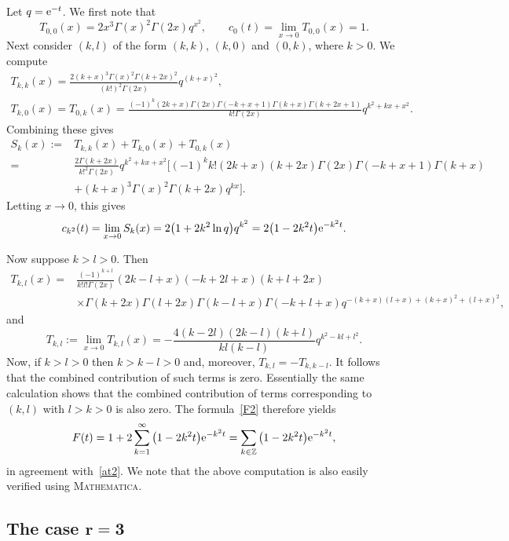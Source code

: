 \documentclass[pdftex]{sigma}
\theoremstyle{definition}
\newcommand\Z{{\mathbb Z}}
\begin{document}
Let $q={\rm e}^{-t}$. We first note that
\[T_{0,0}(x)=2x^3 \Gamma (x)^2 \Gamma (2 x) q^{x^2},\qquad
c_0(t)=\lim_{x\to 0} T_{0,0}(x)=1.\]
Next consider $(k,l)$ of the form $(k,k)$, $(k,0)$ and $(0,k)$, where $k>0$.
We compute
\begin{gather*}
T_{k,k}(x)=\frac{2 (k+x)^3 \Gamma (x)^2 \Gamma (k+2 x)^2}{(k!)^2\Gamma(2x)} q^{(k+x)^2},\\
T_{k,0}(x)=T_{0,k}(x)= \frac{(-1)^k (2 k+x) \Gamma (2 x) \Gamma (-k+x+1) \Gamma (k+x) \Gamma
 (k+2 x+1)}{k!\Gamma(2x)} q^{k^2+k x+x^2}.\end{gather*}
Combining these gives
\begin{align*}
S_k(x) :={}& T_{k,k}(x)+T_{k,0}(x)+T_{0,k}(x) \\
={}& \frac{2 \Gamma (k+2 x) }{k!^2\Gamma(2x)} q^{k^2+k x+x^2}
\big[ (-1)^k k! (2 k+x) (k+2 x) \Gamma (2 x)
 \Gamma (-k+x+1) \Gamma (k+x) \\
 & +(k+x)^3 \Gamma (x)^2 \Gamma (k+2x) q^{kx } \big].
\end{align*}
Letting $x\to 0$, this gives
\[c_{k^2}(t)=\lim_{x\to 0} S_k(x) = 2\big(1+2k^2\ln q\big)q^{k^2}=2\big(1-2k^2t\big){\rm e}^{-k^2 t}.\]

Now suppose $k>l>0$. Then
\begin{align*}
T_{k,l}(x)={}& \frac{ (-1)^{k+l}}{k! l! \Gamma(2x)} (2 k-l+x) (-k+2 l+x) (k+l+2 x) \\
&\times \Gamma (k+2 x) \Gamma (l+2 x) \Gamma (k-l+x) \Gamma (-k+l+x) q^{-(k+x)
 (l+x)+(k+x)^2+(l+x)^2},
\end{align*}
and
\[T_{k,l}:=\lim_{x\to 0} T_{k,l}(x)=-\frac{4 (k-2 l) (2 k-l) (k+l) }{k l (k-l)} q^{k^2-k l+l^2}.\]
Now, if $k>l>0$ then $k>k-l>0$ and, moreover,
$T_{k,l}=-T_{k,k-l}$.
It follows that the combined contribution of such terms is zero.
Essentially the same calculation shows that the
combined contribution of terms corresponding to $(k,l)$ with $l>k>0$ is also zero.
The formula~\eqref{F2} therefore yields
\[F(t)=1+2\sum_{k=1}^\infty \big(1-2k^2t\big){\rm e}^{-k^2 t} = \sum_{k\in\Z} \big(1-2k^2t\big){\rm e}^{-k^2 t},\]
in agreement with~\eqref{at2}. We note that the above computation is also easily verified
using \textsc{Mathematica}.

\subsection[The case r=3]{The case $\boldsymbol{r=3}$}
\end{document}
